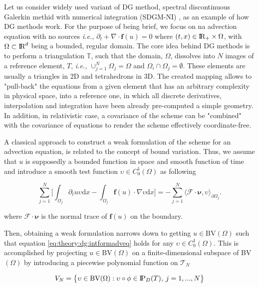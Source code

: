 \documentclass[11pt,a4paper,headinclude=true,DIV=14,BCOR=8mm,chapterprefix,listof=totoc,twoside,openright,abstracton]{scrbook}
\begin{document}
Let us consider widely used variant of DG method, spectral discontinuous Galerkin methid with numerical integration (SDGM-NI) \cite{Hesthaven:2007}, as an example of how DG methods work. For the purpose of being brief, we focus on na advection equation with no sources \textit{i.e.,} $\partial_t + \nabla\cdot\boldsymbol{f}(u) =0$ where $(t,x)\in \text{I\!R}_{+} \times\Omega$, with $\Omega\subset \text{I\!R}^{d}$ being a bounded, regular domain. The core idea behind DG methods is to perform a triangulation $\mathbb{T}$, such that the domain, $\Omega$, dissolves into $N$ images of a reference element, $T$, \textit{i.e.,} $\cup_{j=1}^{N}\Omega_{j} = \Omega$ and $\Omega_{i}\cap\Omega_{j} = \emptyset$. These elements are usually a triangles in 2D and tetrahedrons in 3D. The created mapping allows to "pull-back" the equations from a given element that has an arbitrary complexity in physical space, into a reference one, in which all discrete derivatives, interpolation and integration have been already pre-computed a simple geometry. In addition, in relativistic case, a covariance of the scheme can be "combined" with the covariance of equations to render the scheme effectively coordinate-free. 

A classical approach to construct a weak formulation of the scheme for an advection equation, is related to the concept of bound variation. Thus, we assume that $u$ is supposedly a bounded function in space and smooth function of time and introduce a smooth test function $\upsilon \in C_0 ^1(\Omega)$ as following

\begin{equation}
    \sum_{j=1}^{N}\Bigg[\int_{\Omega_j}\partial_{t}u\upsilon\text{d}x - \int_{\Omega_j}\boldsymbol{f}(u)\cdot\nabla\upsilon\text{d}x\Bigg] = -\sum_{j=1}^{N}\langle\boldsymbol{\mathcal{F}}\cdot\boldsymbol{\nu},\upsilon\rangle_{\partial\Omega_j}.
    \label{eq:theory:dg:intformadveq}
\end{equation}

where $\boldsymbol{\mathcal{F}}\cdot\boldsymbol{\nu}$ is the normal trace of $\boldsymbol{f}(u)$ on the boundary.

Then, obtaining a weak formulation narrows down to getting $u\in\text{BV}(\Omega)$ such that equation \ref{eq:theory:dg:intformadveq} holds for any $\upsilon \in C_0 ^1(\Omega)$. This is accomplished by projecting $u\in\text{BV}(\Omega)$ on a finite-dimensional subspace of BV$(\Omega)$ by introducing a piecewise polynomial function on $\mathcal{T}_{N}$

\begin{equation}
V_N = \big\{ \upsilon\in\text{BV}(\Omega):\upsilon\circ\phi\in\text{I\!P}_{D}(T), \: j=1,...,N \big\}
\label{eq:theory:dg:weakforkreq}
\end{equation}
\end{document}
